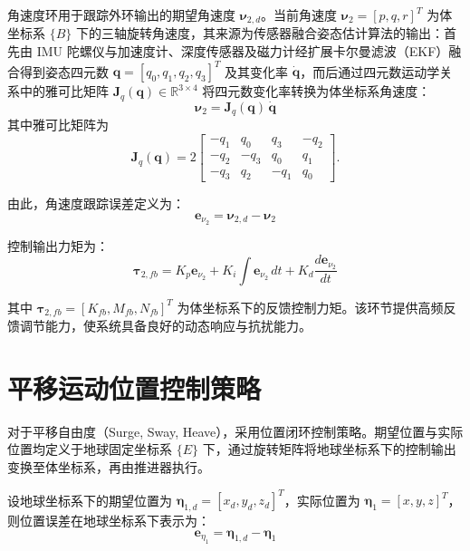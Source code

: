 角速度环用于跟踪外环输出的期望角速度 $\boldsymbol{\nu}_{2,d}$。当前角速度 $\boldsymbol{\nu}_2=[p,q,r]^T$ 为体坐标系 $\{B\}$ 下的三轴旋转角速度，其来源为传感器融合姿态估计算法的输出：首先由 IMU 陀螺仪与加速度计、深度传感器及磁力计经扩展卡尔曼滤波（EKF）融合得到姿态四元数 $\boldsymbol{q}=[q_0,q_1,q_2,q_3]^T$ 及其变化率 $\dot{\boldsymbol{q}}$，而后通过四元数运动学关系中的雅可比矩阵 $\boldsymbol{J}_q(\boldsymbol{q})\in\mathbb{R}^{3\times4}$ 将四元数变化率转换为体坐标系角速度：
\begin{equation}
\boldsymbol{\nu}_2 = \boldsymbol{J}_q(\boldsymbol{q})\,\dot{\boldsymbol{q}}
\end{equation}
其中雅可比矩阵为
\begin{equation}
\boldsymbol{J}_q(\boldsymbol{q}) = 2
\begin{bmatrix}
-q_1 &  q_0 &  q_3 & -q_2 \\[2pt]
-q_2 & -q_3 &  q_0 &  q_1 \\[2pt]
-q_3 &  q_2 & -q_1 &  q_0
\end{bmatrix}.
\end{equation}

由此，角速度跟踪误差定义为：
\begin{equation}
\boldsymbol{e}_{\nu_2} = \boldsymbol{\nu}_{2,d} - \boldsymbol{\nu}_2
\end{equation}

控制输出力矩为：
\begin{equation}
\boldsymbol{\tau}_{2,fb} = K_p \boldsymbol{e}_{\nu_2}
+ K_i \int \boldsymbol{e}_{\nu_2}\,dt
+ K_d \frac{d\boldsymbol{e}_{\nu_2}}{dt}
\end{equation}

其中 $\boldsymbol{\tau}_{2,fb}=[K_{fb},M_{fb},N_{fb}]^T$ 为体坐标系下的反馈控制力矩。该环节提供高频反馈调节能力，使系统具备良好的动态响应与抗扰能力。

\section{平移运动位置控制策略}

对于平移自由度（Surge, Sway, Heave），采用位置闭环控制策略。期望位置与实际位置均定义于地球固定坐标系 $\{E\}$ 下，通过旋转矩阵将地球坐标系下的控制输出变换至体坐标系，再由推进器执行。

设地球坐标系下的期望位置为 $\boldsymbol{\eta}_{1,d}=[x_d, y_d, z_d]^T$，实际位置为 $\boldsymbol{\eta}_1=[x, y, z]^T$，则位置误差在地球坐标系下表示为：
\begin{equation}
\boldsymbol{e}_{\eta_1} = \boldsymbol{\eta}_{1,d} - \boldsymbol{\eta}_1
\end{equation}


